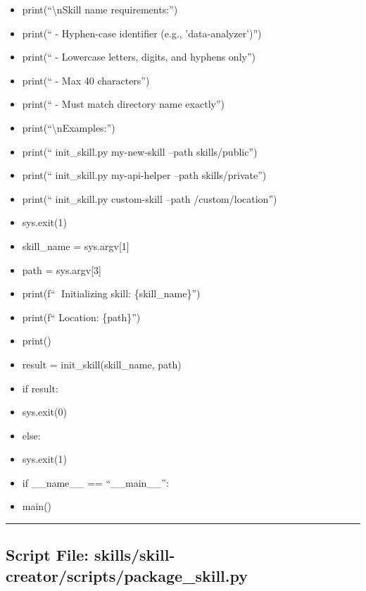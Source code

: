 \documentclass[11pt]{article}
\begin{document}
\begin{itemize}[leftmargin=*,itemsep=2pt,topsep=2pt]
\item {} print(``\textbackslash{}nSkill name requirements:'')
\item {} print(`` - Hyphen-case identifier (e.g., 'data-analyzer')'')
\item {} print(`` - Lowercase letters, digits, and hyphens only'')
\item {} print(`` - Max 40 characters'')
\item {} print(`` - Must match directory name exactly'')
\item {} print(``\textbackslash{}nExamples:'')
\item {} print(`` init\_\allowbreak{}skill.py my-new-skill --path skills/public'')
\item {} print(`` init\_\allowbreak{}skill.py my-api-helper --path skills/private'')
\item {} print(`` init\_\allowbreak{}skill.py custom-skill --path /custom/location'')
\item {} sys.exit(1)
\item {} skill\_\allowbreak{}name = sys.argv[1]
\item {} path = sys.argv[3]
\item {} print(f``🚀 Initializing skill: \{skill\_\allowbreak{}name\}'')
\item {} print(f`` Location: \{path\}'')
\item {} print()
\item {} result = init\_\allowbreak{}skill(skill\_\allowbreak{}name, path)
\item {} if result:
\item {} sys.exit(0)
\item {} else:
\item {} sys.exit(1)
\item {} if \_\allowbreak{}\_\allowbreak{}name\_\allowbreak{}\_\allowbreak{} == ``\_\allowbreak{}\_\allowbreak{}main\_\allowbreak{}\_\allowbreak{}'':
\item {} main()
\end{itemize}

\vspace{0.8em}\hrule\vspace{0.8em}

\subsection{Script File: skills/skill-creator/scripts/package\_\allowbreak{}skill.py}\label{file:skills-skill-creator-scripts-package-skill-py}
\end{document}
